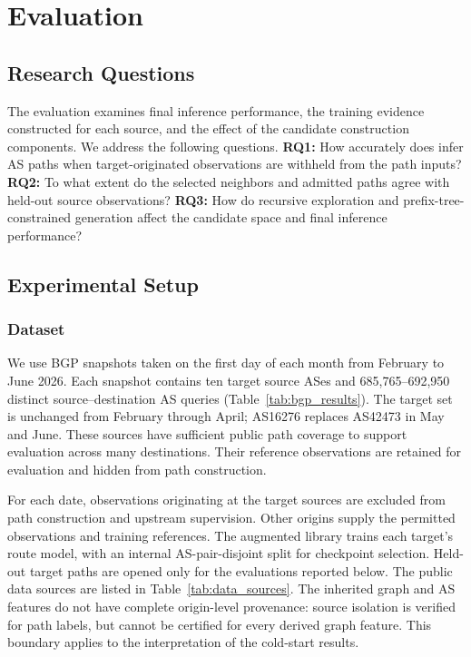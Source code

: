 \section{Evaluation}
\label{sec:evaluation}

\subsection{Research Questions}

The evaluation examines final inference performance, the training
evidence constructed for each source, and the effect of the candidate
construction components. We address the following questions.
\textbf{RQ1:} How accurately does \sys infer AS paths when
target-originated observations are withheld from the path inputs?
\textbf{RQ2:} To what extent do the selected neighbors and admitted
paths agree with held-out source observations?
\textbf{RQ3:} How do recursive exploration and prefix-tree-constrained
generation affect the candidate space and final inference performance?

\subsection{Experimental Setup}

\subsubsection{Dataset}

We use BGP snapshots taken on the first day of each month from
February to June 2026. Each snapshot contains ten target source ASes
and 685,765--692,950 distinct source--destination AS queries
(Table~\ref{tab:bgp_results}). The target set is unchanged from
February through April; AS16276 replaces AS42473 in May and June.
These sources have sufficient public path coverage to support
evaluation across many destinations. Their reference observations are
retained for evaluation and hidden from path construction.

For each date, observations originating at the target sources are
excluded from path construction and upstream supervision. Other
origins supply the permitted observations and training references.
The augmented library trains each target's route model, with an
internal AS-pair-disjoint split for checkpoint selection. Held-out
target paths are opened only for the evaluations reported below.
The public data sources are listed in Table~\ref{tab:data_sources}.
The inherited graph and AS features do not have complete origin-level
provenance: source isolation is verified for path labels, but cannot
be certified for every derived graph feature. This boundary applies
to the interpretation of the cold-start results.

